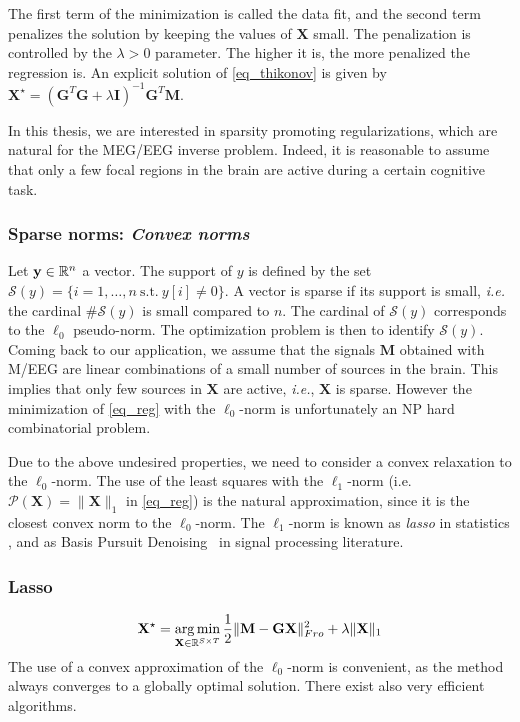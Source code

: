The first term of the minimization is called the data fit, and the second term penalizes the solution by keeping the values of $\mathbf{X}$ small. The penalization is controlled by the $\lambda>0$ parameter. The higher it is, the more penalized the regression is. An explicit solution of \ref{eq_thikonov} is given by $\mathbf{X}^\star = (\mathbf{G}^T\mathbf{G}+\lambda\mathbf{I})^{-1}\mathbf{G}^T\mathbf{M}$. 

In this thesis, we are interested in sparsity promoting regularizations, which are natural for the MEG/EEG inverse problem. Indeed, it is reasonable to assume that only a few focal regions in the brain are active during a certain cognitive task.

\subsubsection*{Sparse norms: \textit{Convex norms}}
Let $\mathbf{y}\in\mathbb{R}^n$ a vector. The support of $y$ is defined by the set $\mathcal{S}(y) = \{i=1,\dots ,n \mathrm{\ s.t.\ } y[i]\neq 0\}$.
A vector is sparse if its support is small, \textit{i.e.} the cardinal $\# \mathcal{S}(y)$ is small compared to $n$.
The cardinal of $\mathcal{S}(y)$ corresponds to the $\ell_0$ pseudo-norm. The optimization problem is then to identify $\mathcal{S}(y)$.\\

Coming back to our application, we assume that the signals $\mathbf{M}$ obtained with M/EEG are linear combinations of a small number of sources in the brain. This implies that only few sources in $\mathbf{X}$ are active, \textit{i.e.}, $\mathbf{X}$ is sparse. However the minimization of \eqref{eq_reg} with the $\ell_0$-norm is unfortunately an NP hard combinatorial problem.

Due to the above undesired properties, we need to consider a convex relaxation to the $\ell_0$-norm. The use of the least squares with the $\ell_1$-norm (i.e. $\mathcal{P}(\mathbf{X})=\|\mathbf{X}\|_1$ in \eqref{eq_reg}) is the natural approximation, since it is the closest convex norm to the $\ell_0$-norm. The $\ell_1$-norm is known as \textit{lasso} in statistics \cite{tibshirani1996regression}, and as Basis Pursuit Denoising~\cite{chen2001atomic} in signal processing literature.

\adjustwidth{1em}{0pt}
\subsubsection*{Lasso}
\begin{equation} \label{eq_lasso}
	\mathbf{X}^\star = \mathop{\mathrm{arg}\,\mathrm{min}}_{\mathbf{X}\in\mathbb{R}^{S\times T}}\frac{1}{2}\|\mathbf{M}-\mathbf{GX}\|_{Fro}^2 + \lambda\|\mathbf{X}\|_1
\end{equation}
\endadjustwidth
The use of a convex approximation of the $\ell_0$-norm is convenient, as the method always converges to a globally optimal solution. There exist also very efficient algorithms.


